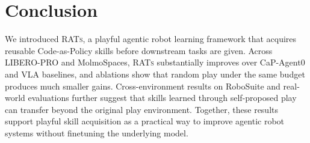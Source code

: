 \section{Conclusion}
\label{sec:conclusion}

We introduced \textsc{RATs}, a playful agentic robot learning framework that
acquires reusable Code-as-Policy skills before downstream tasks are given.
Across LIBERO-PRO and MolmoSpaces, \textsc{RATs} substantially improves over CaP-Agent0 and VLA
baselines, and ablations show that random play under the same budget produces
much smaller gains. Cross-environment results on RoboSuite and real-world evaluations further suggest that
skills learned through self-proposed play can transfer beyond the original play
environment. Together, these results support playful skill acquisition as a
practical way to improve agentic robot systems without finetuning the underlying
model.
